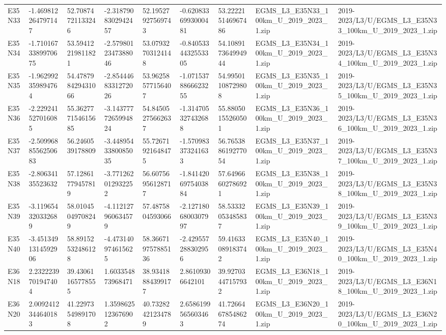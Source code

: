 \begin{landscape}
\begin{longtable}{lllllllll}
E35N33 & -1.469812264797147 & 52.70874721133246 & -2.3187908302942457 & 52.19527927569743 & -0.6208336993000481 & 53.222215146967486 & EGMS\_L3\_E35N33\_100km\_U\_2019\_2023\_1.zip & 2019-2023/L3/U/EGMS\_L3\_E35N33\_100km\_U\_2019\_2023\_1.zip \\
E35N34 & -1.7101673389970675 & 53.59412219811821 & -2.5798012347388046 & 53.07932703124148 & -0.8405334432553305 & 54.108917364994944 & EGMS\_L3\_E35N34\_100km\_U\_2019\_2023\_1.zip & 2019-2023/L3/U/EGMS\_L3\_E35N34\_100km\_U\_2019\_2023\_1.zip \\
E35N35 & -1.962992359894764 & 54.478798429431066 & -2.8544468331272026 & 53.96258577156407 & -1.0715378866623255 & 54.99501108729808 & EGMS\_L3\_E35N35\_100km\_U\_2019\_2023\_1.zip & 2019-2023/L3/U/EGMS\_L3\_E35N35\_100km\_U\_2019\_2023\_1.zip \\
E35N36 & -2.229241527016085 & 55.362777154615685 & -3.1437777265994824 & 54.84505275662637 & -1.314705327432688 & 55.88050155260501 & EGMS\_L3\_E35N36\_100km\_U\_2019\_2023\_1.zip & 2019-2023/L3/U/EGMS\_L3\_E35N36\_100km\_U\_2019\_2023\_1.zip \\
E35N37 & -2.5099688556250683 & 56.2460539178809 & -3.4489543380085035 & 55.72671921648475 & -1.570983373241633 & 56.765388619277054 & EGMS\_L3\_E35N37\_100km\_U\_2019\_2023\_1.zip & 2019-2023/L3/U/EGMS\_L3\_E35N37\_100km\_U\_2019\_2023\_1.zip \\
E35N38 & -2.80634135523632 & 57.12861779457819 & -3.771262012932252 & 56.60756956128717 & -1.8414206975403884 & 57.64966602786921 & EGMS\_L3\_E35N38\_100km\_U\_2019\_2023\_1.zip & 2019-2023/L3/U/EGMS\_L3\_E35N38\_100km\_U\_2019\_2023\_1.zip \\
E35N39 & -3.119654320332689 & 58.01045049708249 & -4.112127960634579 & 57.4875804593066 & -2.1271806800307997 & 58.53332053485837 & EGMS\_L3\_E35N39\_100km\_U\_2019\_2023\_1.zip & 2019-2023/L3/U/EGMS\_L3\_E35N39\_100km\_U\_2019\_2023\_1.zip \\
E35N40 & -3.4513491314592906 & 58.89152532486128 & -4.473140974615625 & 58.366719757885136 & -2.429557288302956 & 59.41633089183742 & EGMS\_L3\_E35N40\_100km\_U\_2019\_2023\_1.zip & 2019-2023/L3/U/EGMS\_L3\_E35N40\_100km\_U\_2019\_2023\_1.zip \\
E36N18 & 2.2322239701947404 & 39.43061165778555 & 1.603354873968471 & 38.93418884399177 & 2.86109306642101 & 39.92703447157932 & EGMS\_L3\_E36N18\_100km\_U\_2019\_2023\_1.zip & 2019-2023/L3/U/EGMS\_L3\_E36N18\_100km\_U\_2019\_2023\_1.zip \\
E36N20 & 2.0092412344640183 & 41.22973549891708 & 1.3598625123676902 & 40.73282421234789 & 2.6586199565603463 & 41.726646785486274 & EGMS\_L3\_E36N20\_100km\_U\_2019\_2023\_1.zip & 2019-2023/L3/U/EGMS\_L3\_E36N20\_100km\_U\_2019\_2023\_1.zip \\

\end{longtable}
\end{landscape}

